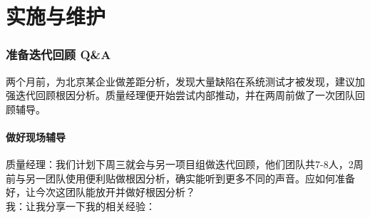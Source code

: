 

\chapter{实施与维护} %

\hypertarget{ux51c6ux5907ux8fedux4ee3ux56deux987e-qa}{%
\subsection{准备迭代回顾
Q\&A}\label{ux51c6ux5907ux8fedux4ee3ux56deux987e-qa}}

两个月前，为北京某企业做差距分析，发现大量缺陷在系统测试才被发现，建议加强迭代回顾根因分析。质量经理便开始尝试内部推动，并在两周前做了一次团队回顾辅导。

\hypertarget{ux505aux597dux73b0ux573aux8f85ux5bfc}{%
\subsubsection{做好现场辅导}\label{ux505aux597dux73b0ux573aux8f85ux5bfc}}

质量经理：我们计划下周三就会与另一项目组做迭代回顾，他们团队共7-8人，2周前与另一团队使用便利贴做根因分析，确实能听到更多不同的声音。应如何准备好，让今次这团队能放开并做好根因分析？\\
我：让我分享一下我的相关经验：\\

